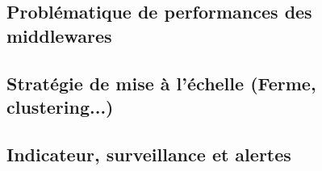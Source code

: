 \subsection{Problématique de performances des middlewares}

\subsection{Stratégie de mise à l'échelle (Ferme, clustering...)}

\subsection{Indicateur, surveillance et alertes}

